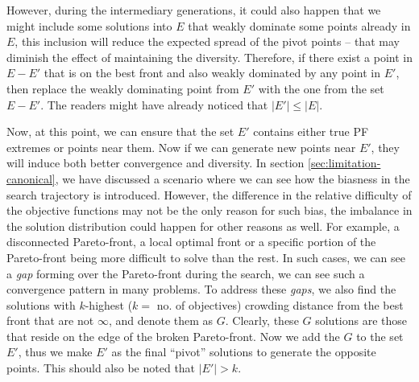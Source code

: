 \documentclass[journal]{IEEEtran}
\begin{document}
However, during the intermediary generations, it could also happen that we might include some solutions into \(E\) that weakly dominate some points already in \(E\), this inclusion will reduce the expected spread of the pivot points -- that may diminish the effect of maintaining the diversity. Therefore, if there exist a point in \(E - E'\) that is on the best front and also weakly dominated by any point in \(E'\), then replace the weakly dominating point from \(E'\) with the one from the set \(E - E'\). The readers might have already noticed that \(|E'| \le |E|\). \vfill \eject

Now, at this point, we can ensure that the set \(E'\) contains either true PF extremes or points near them. Now if we can generate new points near \(E'\), they will induce both better convergence and diversity. In section \ref{sec:limitation-canonical}, we have discussed a scenario where we can see how the biasness in the search trajectory is introduced. However, the difference in the relative difficulty of the objective functions may not be the only reason for such bias, the imbalance in the solution distribution could happen for other reasons as well. For example, a disconnected Pareto-front, a local optimal front or a specific portion of the Pareto-front being more difficult to solve than the rest. In such cases, we can see a \textit{gap} forming over the Pareto-front during the search, we can see such a convergence pattern in many problems. To address these \textit{gaps}, we also find the solutions with \(k\)-highest (\(k = \) no. of objectives) crowding distance from the best front that are not \(\infty\), and denote them as \(G\). Clearly, these \(G\) solutions are those that reside on the edge of the broken Pareto-front. Now we add the \(G\) to the set \(E'\), thus we make \(E'\) as the final ``pivot'' solutions to generate the opposite points. This should also be noted that \(|E'| > k\).
%
\end{document}
